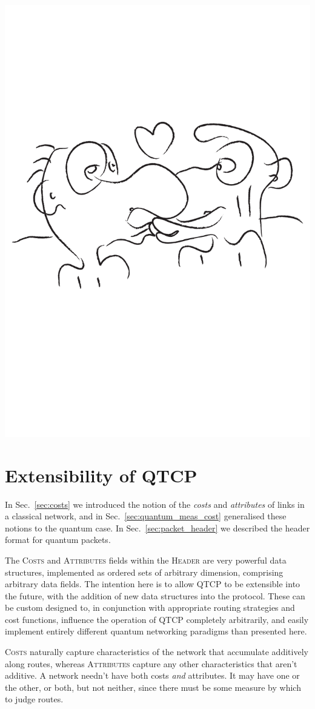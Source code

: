 \documentclass[aps, rmp, twocolumn, amsmath, amssymb, nofootinbib, superscriptaddress, longbibliography, floatfix, table-of-contents, eqsecnum]{revtex4-1}
\begin{document}
\begin{center}
	\includegraphics[width=0.6\columnwidth]{sketch_15}
\end{center}

%
%

\section{Extensibility of QTCP} \label{sec:c_vs_a}

In Sec.~\ref{sec:costs} we introduced the notion of the \textit{costs} and \textit{attributes} of links in a classical network, and in Sec.~\ref{sec:quantum_meas_cost} generalised these notions to the quantum case. In Sec.~\ref{sec:packet_header} we described the header format for quantum packets.

The \textsc{Costs} and \textsc{Attributes} fields within the \textsc{Header} are very powerful data structures, implemented as ordered sets of arbitrary dimension, comprising arbitrary data fields. The intention here is to allow QTCP to be extensible into the future, with the addition of new data structures into the protocol. These can be custom designed to, in conjunction with appropriate routing strategies and cost functions, influence the operation of QTCP completely arbitrarily, and easily implement entirely different quantum networking paradigms than presented here.

\textsc{Costs} naturally capture characteristics of the network that accumulate additively along routes, whereas \textsc{Attributes} capture any other characteristics that aren't additive. A network needn't have both costs \textit{and} attributes. It may have one or the other, or both, but not neither, since there must be some measure by which to judge routes.
\end{document}
